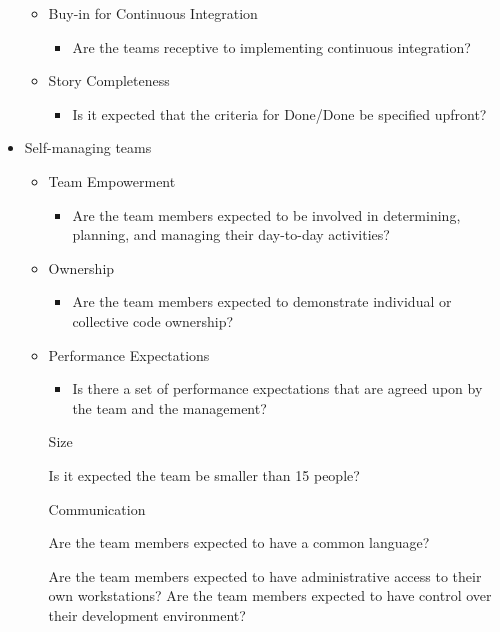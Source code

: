 \begin{appendices}
\begin{itemize}
\begin{itemize}
\begin{itemize}
				\end{itemize}
			\item Buy-in for Continuous Integration
				\begin{itemize}
					\item Are the teams receptive to implementing continuous integration?
				\end{itemize}
			\item Story Completeness
				\begin{itemize}
					\item Is it expected that the criteria for Done/Done be specified upfront?
				\end{itemize}
		\end{itemize}
	\item Self-managing teams
		\begin{itemize}
			\item Team Empowerment
				\begin{itemize}
					\item Are the team members expected to be involved in determining, planning, and managing their day-to-day activities?
				\end{itemize}
			\item Ownership
				\begin{itemize}
					\item Are the team members expected to demonstrate individual or collective code ownership? 
				\end{itemize}
			\item Performance Expectations
				\begin{itemize}
					\item Is there a set of performance expectations that are agreed upon by the team and the management?
				\end{itemize}
			\addition Size
				\begin{itemize}
					\addition Is it expected the team be smaller than 15 people?
				\end{itemize}
			\addition Communication
				\begin{itemize}
					\addition Are the team members expected to have a common language?
				\end{itemize}
			\addition{System Administration}
				\begin{itemize}
					\addition Are the team members expected to have administrative access to their own workstations?
					\addition Are the team members expected to have control over their development environment?	

\end{itemize}
\end{itemize}
\end{itemize}
\end{appendices}
